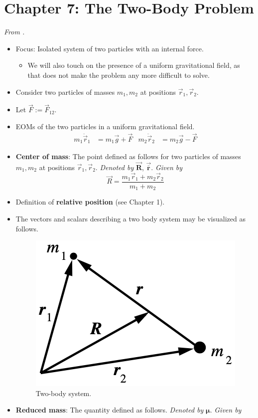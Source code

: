 \documentclass[../notes.tex]{subfiles}
\begin{document}
\section{Chapter 7: The Two-Body Problem}
\emph{From \textcite{bib:KibbleBerkshire}.}
\begin{itemize}
    \item {}Focus: Isolated system of two particles with an internal force.
    \begin{itemize}
        \item We will also touch on the presence of a uniform gravitational field, as that does not make the problem any more difficult to solve.
    \end{itemize}
    \item Consider two particles of masses $m_1,m_2$ at positions $\vec{r}_1,\vec{r}_2$.
    \item Let $\vec{F}:=\vec{F}_{12}$.
    \item EOMs of the two particles in a uniform gravitational field.
    \begin{align*}
        m_1\ddot{\vec{r}}_1 &= m_1\vec{g}+\vec{F}&
        m_2\ddot{\vec{r}}_2 &= m_2\vec{g}-\vec{F}
    \end{align*}
    \item \textbf{Center of mass}: The point defined as follows for two particles of masses $m_1,m_2$ at positions $\vec{r}_1,\vec{r}_2$. \emph{Denoted by} $\bm{\vec{R}}$, $\bm{\vec{\bar{r}}}$. \emph{Given by}
    \begin{equation*}
        \vec{R} = \frac{m_1\vec{r}_1+m_2\vec{r}_2}{m_1+m_2}
    \end{equation*}
    \item Definition of \textbf{relative position} (see Chapter 1).
    \item The vectors and scalars describing a two body system may be visualized as follows.
    \begin{figure}[h!]
        \centering
        \includegraphics[width=0.2\linewidth]{../ExtFiles/2BodySystem.png}
        \caption{Two-body system.}
        \label{fig:2BodySystem}
    \end{figure}
    \item \textbf{Reduced mass}: The quantity defined as follows. \emph{Denoted by} $\bm{\mu}$. \emph{Given by}

\end{itemize}
\end{document}
